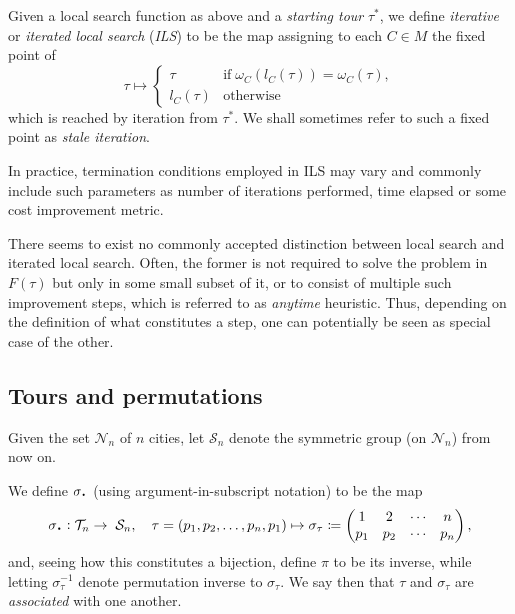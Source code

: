 \documentclass[titlepage,twoside,index=totoc,bibliography=totoc]{scrartcl}
\newcommand*{\Cdot}{\raisebox{-0.30ex}{\scalebox{1.5}{$\cdot$}}}
\numberwithin{equation}{section}
\numberwithin{figure}{section}
\numberwithin{table}{section}
\let\defstyle\itshape
\begin{document}
\begin{define}[ILS]
\label{def:ils}
  Given a local search function as above and a {\defstyle starting tour}
  $\tau^\ast$, we define {\defstyle iterative} or {\defstyle iterated local search}
  ({\defstyle ILS}) to be the map assigning to each $C \in M$ the
  fixed point of
  \[
    \tau \mapsto
    \begin{cases}
      \tau \quad & \text{if} \;
      \omega_C\left(l_C\left(\tau\right)\right) = \omega_C\left(\tau\right),
      \\
      l_C\left(\tau\right) & \text{otherwise}
    \end{cases}
  \]
  which is reached by iteration from $\tau^\ast$.
  We shall sometimes refer to such a fixed point as {\defstyle stale iteration}.
\end{define}

In practice, termination conditions employed in ILS may vary and commonly
include such parameters as number of iterations performed, time elapsed
or some cost improvement metric.

\begin{remark}
  There seems to exist no commonly accepted distinction between local
  search and iterated local search.  Often, the former is not required to
  solve the problem in $F\left(\tau\right)$ but only in some small subset
  of it, or to consist of multiple such improvement steps, which is
  referred to as {\defstyle anytime} heuristic.  Thus, depending on the
  definition of what constitutes a step, one can potentially be seen as
  special case of the other.
\end{remark}

\subsection{Tours and permutations}

Given the set $\mathcal{N}_n$ of $n$ cities, let $\mathcal{S}_n$ denote the
symmetric group (on $\mathcal{N}_n$) from now on.

\begin{define}
  We define $\sigma_{\Cdot}$ (using argument-in-subscript notation) to be the map
  \[
      \sigma_{\Cdot} :
      \mathcal{T}_n \to \; \mathcal{S}_n, \quad
      \tau = \left(p_1, p_2, \ldots, p_n, p_1 \right)
      \mapsto
    \sigma_\tau \coloneqq
    \begin{pmatrix}
      1 & 2 & \cdots & n \\
      p_1 & p_2 & \cdots &  p_n
    \end{pmatrix},
  \]
  and, seeing how this constitutes a bijection, define $\pi$ to be its inverse,
  while letting $\sigma_\tau^{-1}$ denote permutation inverse to $\sigma_\tau$.
  We say then that $\tau$ and $\sigma_\tau$ are {\defstyle associated} with one another.
\end{define}
\end{document}
